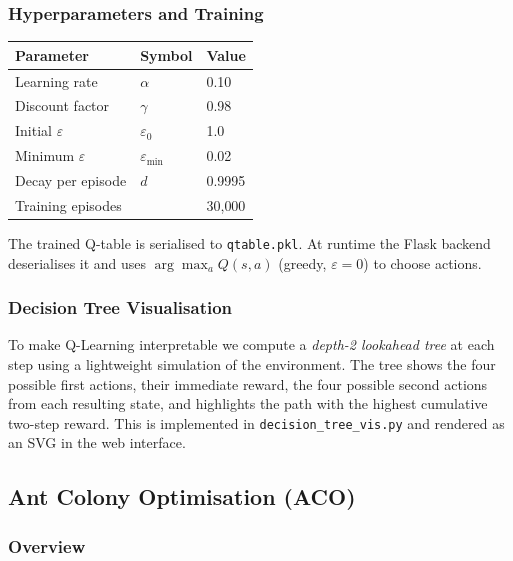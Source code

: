 \documentclass[12pt,a4paper]{article}
\begin{document}
\subsubsection{Hyperparameters and Training}

\begin{center}
\begin{tabular}{lll}
\toprule
\textbf{Parameter} & \textbf{Symbol} & \textbf{Value} \\
\midrule
Learning rate      & $\alpha$        & 0.10 \\
Discount factor    & $\gamma$        & 0.98 \\
Initial $\varepsilon$ & $\varepsilon_0$ & 1.0 \\
Minimum $\varepsilon$ & $\varepsilon_{\min}$ & 0.02 \\
Decay per episode  & $d$             & 0.9995 \\
Training episodes  &                 & 30{,}000 \\
\bottomrule
\end{tabular}
\end{center}

The trained Q-table is serialised to \texttt{qtable.pkl}.  At runtime the Flask
backend deserialises it and uses $\arg\max_a Q(s,a)$ (greedy, $\varepsilon=0$)
to choose actions.

\subsubsection{Decision Tree Visualisation}

To make Q-Learning interpretable we compute a \emph{depth-2 lookahead tree} at
each step using a lightweight simulation of the environment.  The tree shows the
four possible first actions, their immediate reward, the four possible second actions
from each resulting state, and highlights the path with the highest cumulative
two-step reward.  This is implemented in \texttt{decision\_tree\_vis.py} and
rendered as an SVG in the web interface.

\subsection{Ant Colony Optimisation (ACO)}

\subsubsection{Overview}
\end{document}
